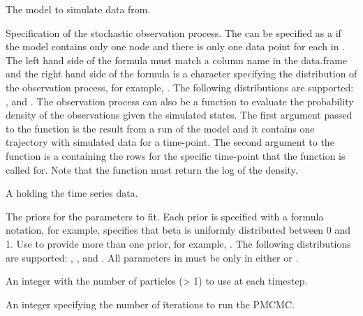 \documentclass[letterpaper]{book}
\begin{document}
\begin{Arguments}
\begin{ldescription}
\item[\code{model}] The model to simulate data from.

\item[\code{obs\_process}] Specification of the stochastic observation
process. The  can be specified as a
 if the model contains only one node and there
is only one data point for each  in .
The left hand side of the formula must match a column name in
the  data.frame and the right hand side of the
formula is a character specifying the distribution of the
observation process, for example, .
The following distributions are supported: ,  and . The observation process can also be a
function to evaluate the probability density of the
observations given the simulated states. The first argument
passed to the  function is the result from a
run of the model and it contains one trajectory with simulated
data for a time-point. The second argument to the
 function is a  containing
the rows for the specific time-point that the function is
called for. Note that the function must return the log of the
density.

\item[\code{data}] A  holding the time series data.

\item[\code{priors}] The priors for the parameters to fit. Each prior is
specified with a formula notation, for example,  specifies that beta is uniformly distributed
between 0 and 1. Use  to provide more than one
prior, for example, . The following distributions are supported:
, ,  and
. All parameters in  must be only
in either  or .

\item[\code{n\_particles}] An integer with the number of particles (> 1)
to use at each timestep.

\item[\code{n\_iterations}] An integer specifying the number of iterations
to run the PMCMC.


\end{ldescription}
\end{Arguments}
\end{document}
